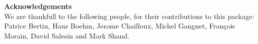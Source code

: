 \clearpage

\newpage



\clearpage

{\Large \bf Acknowledgements}\\

We are thankfull to the following people, for their contributions
to this package:
Patrice Bertin, Hans Boehm, Jerome Chailloux, Michel Gangnet, 
Fran\c{c}ois Morain, David Salesin and Mark Shand.

\vspace{2cm}

\tableofcontents

\clearpage
\printindex


